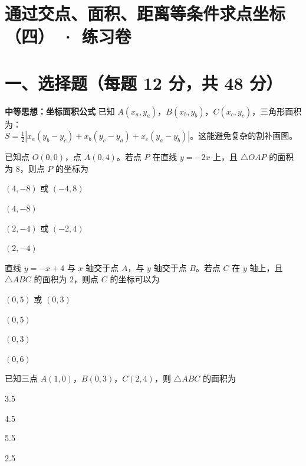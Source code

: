 \documentclass{exam-zh}
\begin{document}
\section*{通过交点、面积、距离等条件求点坐标（四） · 练习卷}

\section*{一、选择题（每题 12 分，共 48 分）}


\begin{keyideabox}
  \textbf{中等思想：坐标面积公式}
  已知 $A(x_a, y_a)$，$B(x_b, y_b)$，$C(x_c, y_c)$，三角形面积为：\\ $S = \frac{1}{2}|x_a(y_b - y_c) + x_b(y_c - y_a) + x_c(y_a - y_b)|$。这能避免复杂的割补画图。
\end{keyideabox}



\begin{question}[points=12]
  已知点 $O(0, 0)$，点 $A(0, 4)$。若点 $P$ 在直线 $y = -2x$ 上，且 $\triangle OAP$ 的面积为 $8$，则点 $P$ 的坐标为
  \begin{choices}
    \item $(4, -8)$ 或 $(-4, 8)$
    \item $(4, -8)$
    \item $(2, -4)$ 或 $(-2, 4)$
    \item $(2, -4)$
  \end{choices}
\end{question}



\begin{question}[points=12]
  直线 $y = -x + 4$ 与 $x$ 轴交于点 $A$，与 $y$ 轴交于点 $B$。若点 $C$ 在 $y$ 轴上，且 $\triangle ABC$ 的面积为 2，则点 $C$ 的坐标可以为
  \begin{choices}
    \item $(0, 5)$ 或 $(0, 3)$
    \item $(0, 5)$
    \item $(0, 3)$
    \item $(0, 6)$
  \end{choices}
\end{question}



\begin{question}[points=12]
  已知三点 $A(1, 0)$，$B(0, 3)$，$C(2, 4)$，则 $\triangle ABC$ 的面积为
  \begin{choices}
    \item 3.5
    \item 4.5
    \item 5.5
    \item 2.5
  \end{choices}
\end{question}
\end{document}
